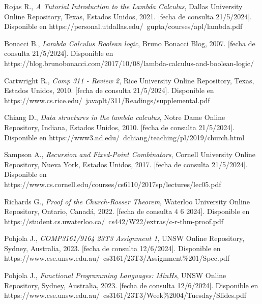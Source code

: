 \begin{thebibliography}{11}
     \bibitem{}
    \label{sec:109}
    \hypertarget{109}{}
    Rojas R., \textit{A Tutorial Introduction to the Lambda Calculus}, Dallas University Online Repository, Texas, Estados Unidos, 2021.  [fecha de consulta 21/5/2024]. Disponible en https://personal.utdallas.edu/~gupta/courses/apl/lambda.pdf

     \bibitem{}
    \label{sec:110}
    \hypertarget{110}{}
    Bonacci B., \textit{Lambda Calculus Boolean logic}, Bruno Bonacci Blog, 2007.  [fecha de consulta 21/5/2024]. Disponible en https://blog.brunobonacci.com/2017/10/08/lambda-calculus-and-boolean-logic/

     \bibitem{}
    \label{sec:111}
    \hypertarget{111}{}
    Cartwright R., \textit{Comp 311 - Review 2}, Rice University Online Repository, Texas, Estados Unidos, 2010.  [fecha de consulta 21/5/2024]. Disponible en https://www.cs.rice.edu/~javaplt/311/Readings/supplemental.pdf

     \bibitem{}
    \label{sec:112}
    \hypertarget{112}{}
    Chiang D., \textit{Data structures in the lambda calculus}, Notre Dame Online Repository, Indiana, Estados Unidos, 2010.  [fecha de consulta 21/5/2024]. Disponible en https://www3.nd.edu/~dchiang/teaching/pl/2019/church.html

     \bibitem{}
    \label{sec:113}
    \hypertarget{113}{}
    Sampson A., \textit{Recursion and Fixed-Point Combinators}, Cornell University Online Repository, Nueva York, Estados Unidos, 2017.  [fecha de consulta 21/5/2024]. Disponible en https://www.cs.cornell.edu/courses/cs6110/2017sp/lectures/lec05.pdf

     \bibitem{}
    \label{sec:114}
    \hypertarget{114}{}
    Richards G., \textit{Proof of the Church-Rosser Theorem}, Waterloo University Online Repository, Ontario, Canadá, 2022.  [fecha de consulta 4 6 2024]. Disponible en https://student.cs.uwaterloo.ca/~cs442/W22/extras/c-r-thm-proof.pdf

    \bibitem{}
    \label{sec:115}
    \hypertarget{115}{}
    Pohjola J., \textit{COMP3161/9164 23T3 Assignment 1}, UNSW Online Repository, Sydney, Australia, 2023.  [fecha de consulta 12/6/2024]. Disponible en https://www.cse.unsw.edu.au/~cs3161/23T3/Assignment\%201/Spec.pdf

    \bibitem{}
    \label{sec:116}
    \hypertarget{116}{}
    Pohjola J., \textit{Functional Programming Languages: MinHs}, UNSW Online Repository, Sydney, Australia, 2023.  [fecha de consulta 12/6/2024]. Disponible en https://www.cse.unsw.edu.au/~cs3161/23T3/Week\%2004/Tuesday/Slides.pdf


\end{thebibliography}
